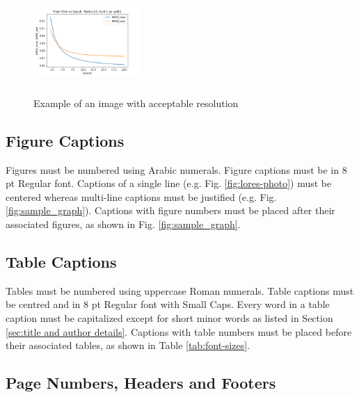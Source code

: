 \documentclass[10pt,conference,letterpaper]{IEEEtran}
\begin{document}
\begin{figure}[h]
	\includegraphics[width=4cm, height=4cm]{plots/train_test_vs_epoch_split1_rank_10_lambd_0_1.png}
	\caption{Example of an image with acceptable resolution}
	\label{fig:hires-photo}
\end{figure}

\subsection{Figure Captions}

Figures must be numbered using Arabic numerals.  Figure captions must
be in 8 pt Regular font.  Captions of a single line (e.g. Fig.
\ref{fig:lores-photo}) must be centered whereas multi-line captions
must be justified (e.g. Fig.  \ref{fig:sample_graph}).  Captions with
figure numbers must be placed after their associated figures, as shown
in Fig. \ref{fig:sample_graph}.

\subsection{Table Captions}

Tables must be numbered using uppercase Roman numerals.  Table
captions must be centred and in 8 pt Regular font with Small Caps.
Every word in a table caption must be capitalized except for short
minor words as listed in Section \ref{sec:title and author details}.
Captions with table numbers must be placed before their associated
tables, as shown in Table \ref{tab:font-sizes}.

\subsection{Page Numbers, Headers and Footers}
\end{document}
